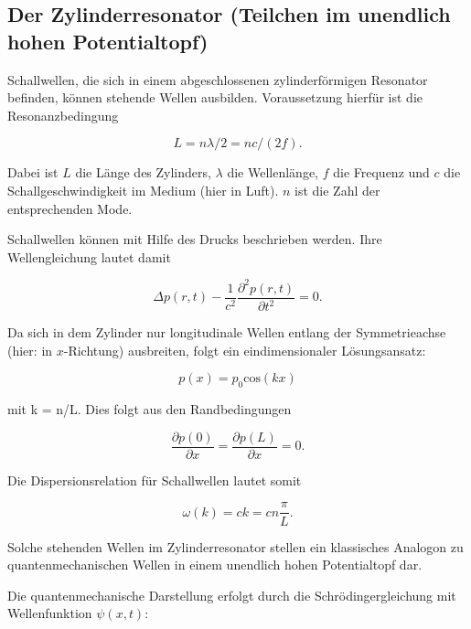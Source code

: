 \subsection{Der Zylinderresonator (Teilchen im unendlich hohen Potentialtopf)}

Schallwellen, die sich in einem abgeschlossenen zylinderförmigen Resonator befinden, können stehende Wellen ausbilden.
Voraussetzung hierfür ist die Resonanzbedingung

\begin{equation}
  L = n \lambda/2 = nc/(2f) .\label{eq:resonanz}
\end{equation}

Dabei ist $L$ die Länge des Zylinders, $\lambda$ die Wellenlänge, $f$ die Frequenz und $c$ die Schallgeschwindigkeit im Medium
(hier in Luft). $n$ ist die Zahl der entsprechenden Mode.

Schallwellen können mit Hilfe des Drucks beschrieben werden. Ihre Wellengleichung lautet damit

\begin{equation}
  \Delta p(r,t) - \frac{1}{c^2} \frac{\partial^2 p(r,t)}{\partial t^2} = 0 .
  \label{eq:wellengl}
\end{equation}

Da sich in dem Zylinder nur longitudinale Wellen entlang der Symmetrieachse (hier: in $x$-Richtung) ausbreiten,
folgt ein eindimensionaler Lösungsansatz:

\begin{equation}
  p(x) = p_0 \text{cos}(kx)
\end{equation}

mit k = n\pi/L. Dies folgt aus den Randbedingungen

\begin{equation}
  \frac{\partial p(0)}{\partial x} = \frac{\partial p(L)}{\partial x} = 0 .
\end{equation}

Die Dispersionsrelation für Schallwellen lautet somit

\begin{equation}
  \omega(k) = ck = cn\frac{\pi}{L} .
\end{equation}

Solche stehenden Wellen im Zylinderresonator stellen ein klassisches Analogon zu quantenmechanischen Wellen in einem
unendlich hohen Potentialtopf dar.

Die quantenmechanische Darstellung erfolgt durch die Schrödingergleichung mit Wellenfunktion $\psi(x,t)$:

